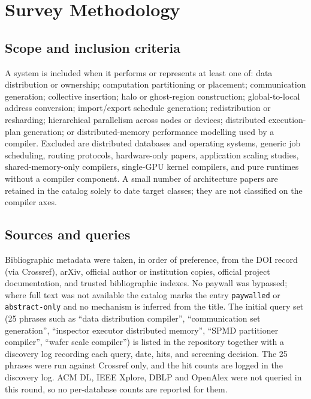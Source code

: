 \section{Survey Methodology}
\label{sec:methodology}

\subsection{Scope and inclusion criteria}
A system is included when it performs or represents at least one of: data distribution or ownership; computation partitioning or placement; communication generation; collective insertion; halo or ghost-region construction; global-to-local address conversion; import/export schedule generation; redistribution or resharding; hierarchical parallelism across nodes or devices; distributed execution-plan generation; or distributed-memory performance modelling used by a compiler.  Excluded are distributed databases and operating systems, generic job scheduling, routing protocols, hardware-only papers, application scaling studies, shared-memory-only compilers, single-GPU kernel compilers, and pure runtimes without a compiler component. A small number of architecture papers are retained in the catalog solely to date target classes; they are not classified on the compiler axes.

\subsection{Sources and queries}
Bibliographic metadata were taken, in order of preference, from the DOI record (via Crossref), arXiv, official author or institution copies, official project documentation, and trusted bibliographic indexes. No paywall was bypassed; where full text was not available the catalog marks the entry \texttt{paywalled} or \texttt{abstract-only} and no mechanism is inferred from the title. The initial query set (25 phrases such as ``data distribution compiler'', ``communication set generation'', ``inspector executor distributed memory'', ``SPMD partitioner compiler'', ``wafer scale compiler'') is listed in the repository together with a discovery log recording each query, date, hits, and screening decision. The 25 phrases were run against Crossref only, and the hit counts are logged in the discovery log. ACM DL, IEEE Xplore, DBLP and OpenAlex were not queried in this round, so no per-database counts are reported for them.

